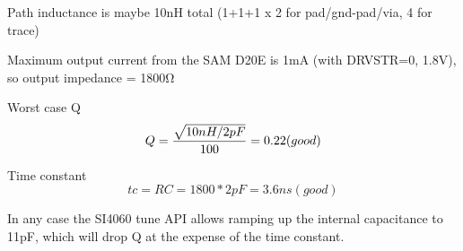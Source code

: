 \documentclass[12pt]{article}
\begin{document}
Path inductance is maybe 10nH total (1+1+1 x 2 for pad/gnd-pad/via, 4
for trace)

Maximum output current from the SAM D20E is 1mA (with DRVSTR=0, 1.8V),
so output impedance = 1800Ω

Worst case Q
\begin{equation}
  Q = {\sqrt{10nH/2pF} \over 100} = 0.22 (good)
\end{equation}

Time constant
\begin{equation}
  tc = RC = 1800*2pF = 3.6ns (good)
\end{equation}

In any case the SI4060 tune API allows ramping up the internal
capacitance to 11pF, which will drop Q at the expense of the time
constant.
\end{document}

